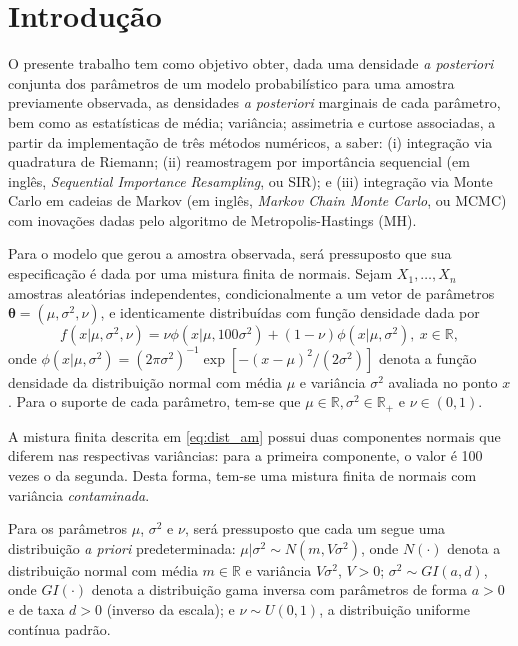 \section{Introdução}

O presente trabalho tem como objetivo obter, dada uma densidade \textit{a posteriori} conjunta dos parâmetros de um modelo probabilístico para uma amostra previamente observada, as densidades \textit{a posteriori} marginais de cada parâmetro, bem como as estatísticas de média; variância; assimetria e curtose associadas, a partir da implementação de três métodos numéricos, a saber: (i) integração via quadratura de Riemann; (ii) reamostragem por importância sequencial (em inglês, \textit{Sequential Importance Resampling}, ou SIR); e (iii) integração via Monte Carlo em cadeias de Markov (em inglês, \textit{Markov Chain Monte Carlo}, ou MCMC) com inovações dadas pelo algoritmo de Metropolis-Hastings (MH).

Para o modelo que gerou a amostra observada, será pressuposto que sua especificação é dada por uma mistura finita de normais. Sejam $X_{1}, \ldots, X_{n}$ amostras aleatórias independentes, condicionalmente a um vetor de parâmetros $\bm{\theta} = (\mu, \sigma^2, \nu)$, e identicamente distribuídas com função densidade dada por
\begin{equation}\label{eq:dist_am}
f(x | \mu, \sigma^2, \nu) = \nu \phi(x | \mu, 100 \sigma^2) + (1 - \nu) \phi(x | \mu, \sigma^2), \ x \in \mathbb{R},
\end{equation}
\noindent onde $\phi(x | \mu, \sigma^2) = (2\pi\sigma^2)^{-1} \exp[-(x - \mu)^2/(2\sigma^2)]$ denota a função densidade da distribuição normal com média $\mu$ e variância $\sigma^2$ avaliada no ponto $x$. Para o suporte de cada parâmetro, tem-se que $\mu \in \mathbb{R}, \sigma^2 \in \mathbb{R}_+$ e $\nu \in (0,1)$.

A mistura finita descrita em \eqref{eq:dist_am} possui duas componentes normais que diferem nas respectivas variâncias: para a primeira componente, o valor é 100 vezes o da segunda. Desta forma, tem-se uma mistura finita de normais com variância \textit{contaminada}.

Para os parâmetros $\mu$, $\sigma^2$ e $\nu$, será pressuposto que cada um segue uma distribuição \textit{a priori} predeterminada: $\mu | \sigma^2 \sim{N} (m, V \sigma^2)$, onde $N(\cdot)$ denota a distribuição normal com média $m \in \mathbb{R}$ e variância $V \sigma^2$, $V > 0$; $\sigma^2 \sim{GI} (a,d)$, onde $GI(\cdot)$ denota a distribuição gama inversa com parâmetros de forma $a > 0$ e de taxa $d > 0$ (inverso da escala); e $\nu \sim{U}(0,1)$, a distribuição uniforme contínua padrão.

